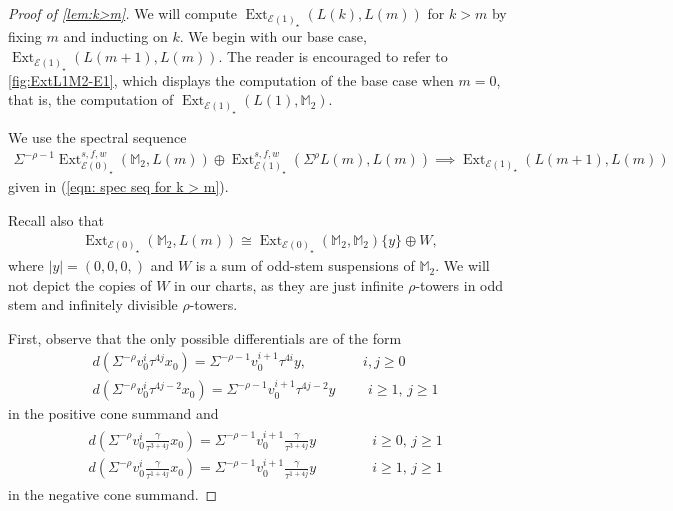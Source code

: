 \documentclass{amsart}
\theoremstyle{plain}
\numberwithin{equation}{section}
\numberwithin{figure}{section}
\DeclareMathOperator{\Ext}{Ext}
\newcommand{\mM}{{\mathbb M}}
\newcommand{\cE}{{\mathcal E}}
\newcommand{\0}{\langle 0 \rangle }
\begin{document}
\begin{proof}[Proof of \cref{lem:k>m}]
We will compute $\Ext_{\cE(1)_\star}(L(k),L(m))$ for $k > m$ by fixing $m$ and inducting on $k$. We begin with our base case, $\Ext_{\cE(1)_\star}(L(m+1),L(m))$. The reader is encouraged to refer to \cref{fig:ExtL1M2-E1}, which displays the computation of the base case when $m=0$, that is, the computation of $\Ext_{\cE(1)_{\star}}\left(L(1), \mM_{2}\right)$. 

We use the spectral sequence
\begin{align*}
    \Sigma^{-\rho - 1}\Ext_{\cE(0)_{\star}}^{s,f,w}( \mM_{2}, L(m) ) \oplus \Ext_{\cE(1)_{\star}}^{s,f,w}(\Sigma^{\rho}L(m) , L(m))
    \implies  \Ext_{\cE(1)_{\star}}(L(m+1), L(m))
\end{align*}
given in (\ref{eqn: spec seq for k > m}). 

Recall also that
\begin{align*}
\Ext_{\cE(0)_{\star}}\left(\mM_{2}, L(m) \right) \cong \Ext_{\cE(0)_{\star}}\left(\mM_{2}, \mM_{2} \right) \{y \}\oplus W,\end{align*}
where $|y| = (0,0,0,)$ and $W$ is a sum of odd-stem suspensions of $\mM_{2}$. We will not depict the copies of $W$ in our charts, as they are just infinite $\rho$-towers in odd stem and infinitely divisible $\rho$-towers. 

First, observe that the only possible differentials are of the form
\begin{equation} \label{eq:diffPC}
\begin{split}
    & d (\Sigma^{-\rho} v_{0}^{i} \tau^{4j}x_{0} ) = \Sigma^{-\rho - 1} v_{0}^{i+1}\tau^{4i}y, \qquad \qquad i,j \geq 0 \\
    & d(\Sigma^{-\rho} v_0^{i} \tau^{4j - 2}x_{0}) = \Sigma^{-\rho - 1} v_0^{i+1} \tau^{4j - 2}y \qquad \, \, i \ge 1, \, j \geq 1
\end{split}
\end{equation}
in the positive cone summand and  
\begin{align} \label{eq:diffNC}
\begin{split}
    & d \left(\Sigma^{-\rho} v_{0}^{i} \frac{\gamma}{\tau^{3 + 4j}}x_{0} \right) = \Sigma^{-\rho -1}v_{0}^{i+1} \frac{\gamma}{\tau^{3 + 4j}}y \qquad \qquad i\ge 0, \, j \geq 1\\
    & d \left( \Sigma^{-\rho} v_{0}^{i} \frac{\gamma}{\tau^{1 + 4j}}x_{0} \right) = \Sigma^{-\rho - 1} v_{0}^{i+1}\frac{\gamma}{\tau^{1 + 4j}}y \qquad \qquad i \ge 1, \, j \geq 1 
\end{split}
\end{align} 
in the negative cone summand.


\end{proof}
\end{document}
